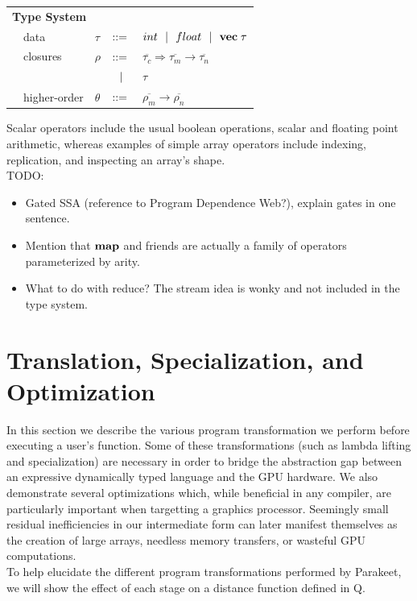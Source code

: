 \documentclass[preprint]{sigplanconf}
\begin{document}
\begin{tabular}{m{0.005cm}m{1.8cm}m{0.05cm}m{0.2cm}p{4.8cm}}
\multicolumn{5}{l}{\textbf{Type System}} \\[4pt]
& data     & $\tau$    & $::=$ & $int \ \ | \ \  float \ \ | \ \  \mathbf{vec} \; \tau   $ \\[4pt]
& closures        & $\rho$  & $::=$ & $\overline{\tau_{c}} \Rightarrow \overline{\tau_m} \rightarrow \overline{\tau_n}$\\[2pt]
&                 &           & $\ \ | \ \ $    & $\tau$ \\[4pt]
& higher-order    & $\theta$  & $::=$ & $\overline{\rho_m} \rightarrow \overline{\rho_n} $ \\[4pt]
\end{tabular}
Scalar operators include the usual boolean operations, scalar and floating point arithmetic, whereas examples of simple array operators include indexing, replication, and inspecting an array's shape. 
\\TODO: 
\begin{itemize}
\item Gated SSA (reference to Program Dependence Web?), explain gates in one sentence. 
\item Mention that $\mbox{\textbf{map}}$ and friends are actually a family of operators parameterized by arity. 
\item What to do with reduce? The stream idea is wonky and not included in the type system. 
\end{itemize} 


\section{Translation, Specialization, and Optimization}
\label{Compilation}
In this section we describe the various program transformation we perform before executing a user's function. 
Some of these transformations (such as lambda lifting and specialization) are necessary in order to bridge the 
abstraction gap between an expressive dynamically typed language and the GPU hardware. 
We also demonstrate several optimizations which, while beneficial in any compiler, are particularly important when targetting a graphics processor. 
Seemingly small residual inefficiencies in our intermediate form can later manifest themselves as the creation of large arrays, needless memory transfers, or wasteful GPU computations. 
\\
To help elucidate the different program transformations performed by Parakeet, we will show the effect of each stage on a distance function defined in Q. 
 
\end{document}
